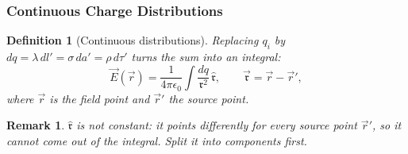 \documentclass{article}
\newtheorem{definition}{Definition}
\newtheorem{remark}{Remark}
\begin{document}
\subsubsection{Continuous Charge Distributions}
\begin{definition}[Continuous distributions]
    Replacing $q_i$ by $dq = \lambda\,dl' = \sigma\,da' = \rho\,d\tau'$ turns the sum into an integral:
    \begin{equation}
        \vec{E}(\vec{r}) = \frac{1}{4\pi\epsilon_0}\int\frac{dq}{\mathfrak{r}^2}\,\hat{\mathfrak{r}},
        \qquad \vec{\mathfrak{r}} = \vec{r} - \vec{r}',
    \end{equation}
    where $\vec{r}$ is the field point and $\vec{r}'$ the source point.
\end{definition}
\begin{remark}
    $\hat{\mathfrak{r}}$ is not constant: it points differently for every source point $\vec{r}'$, so it cannot come out of the integral. Split it into components first.
\end{remark}
\end{document}
